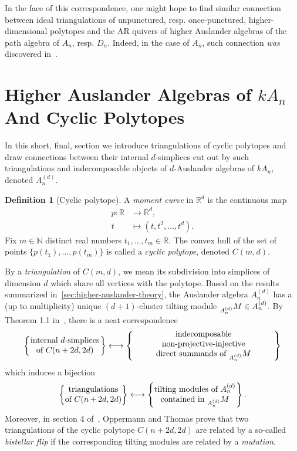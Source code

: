 \documentclass[a4paper,oneside,svgnames,draft]{amsart}
\theoremstyle{plain}
\theoremstyle{definition}
\newtheorem{definition}[theorem]{Definition}
\let\mod\relax
\DeclareMathOperator{\mod}{mod}
\begin{document}
 In the face of this correspondence, one might hope to find similar connection
 between ideal triangulations of unpunctured, resp. once-punctured,
 higher-dimensional polytopes and the AR quivers of higher Auslander algebras of
 the path algebra of $A_n$, resp. $D_n$. Indeed, in the case of $A_n$, such
 connection \emph{was} discovered in~\cite{ot}.

 \section{Higher Auslander Algebras of $kA_n$ And Cyclic Polytopes}
 \label{sec:higher-auslander-algebras-of-kan-and-cyclic-polytopes}

 In this short, final, section we introduce triangulations of cyclic polytopes
 and draw connections between their internal $d$-simplices cut out by such
 triangulations and indecomposable objects of $d$-Auslander algebras of $kA_n$,
 denoted $A^{(d)}_n$.

 \begin{definition}[Cyclic polytope]
  A \emph{moment curve} in $\mathbb{R}^{d}$ is the continuous map
  \begin{align*}
   p:\mathbb{R} & \to \mathbb{R}^{d},\\
   t &\mapsto (t,t^2,\ldots,t^d).
  \end{align*}
  Fix $m \in \mathbb{N}$ distinct real numbers $t_1,\ldots,t_m \in \mathbb{R}$.
  The convex hull of the set of points $\{p(t_1),\ldots,p(t_m)\}$ is called a
  \emph{cyclic polytope}, denoted $C(m,d)$.
 \end{definition}
 By a \emph{triangulation} of $C(m,d)$, we mean its subdivision into simplices
 of dimension $d$ which share all vertices with the polytope. Based on the
 results summarized in~\cref{sec:higher-auslander-theory}, the Auslander algebra
 $A^{(d)}_n$ has a (up to multiplicity) unique $(d+1)$-cluster tilting module
 $\prescript{}{A^{(d)}_n}M \in \mod A^{(d)}_n$. By Theorem 1.1 in~\cite{ot},
 there is a neat correspondence
 \[
  \left\{ \parbox{.25\textwidth}{
    \centering
    internal $d$-simplices \\ of $C(n+2d,2d)$
  } \right\} \longleftrightarrow 
  \left\{ \parbox{.5\textwidth}{
   \centering
   indecomposable non-projective-injective\\
   direct summands of $\prescript{}{A^{(d)}_n}M$
  } \right\}
 \]
 which induces a bijection
 \[
  \left\{ \parbox{.2\textwidth}{
    \centering
    triangulations \\ of $C(n+2d,2d)$
  } \right\} \longleftrightarrow 
  \left\{ \parbox{.29\textwidth}{
   \centering
   tilting modules of $A^{(d)}_n$ \\
   contained in $\prescript{}{A^{(d)}_n}M$
  } \right\}.
 \]
 Moreover, in section 4 of~\cite{ot}, Oppermann and Thomas prove that two
 triangulations of the cyclic polytope $C(n+2d,2d)$ are related by a so-called
 \emph{bistellar flip} if the corresponding tilting modules are related by a
 \emph{mutation}.
\end{document}
